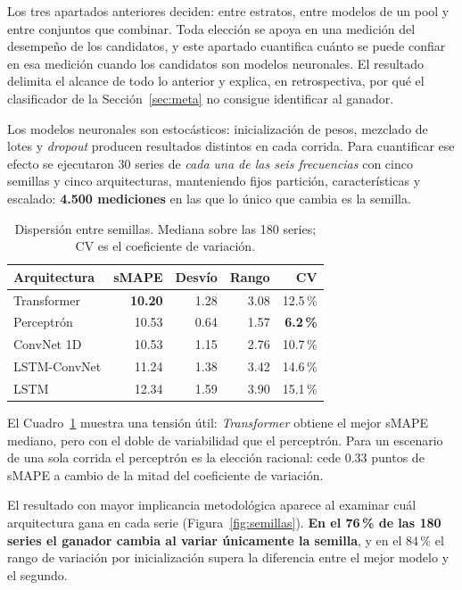 Los tres apartados anteriores deciden: entre estratos, entre modelos de un pool y
entre conjuntos que combinar.
Toda elección se apoya en una medición del desempeño de los candidatos, y este
apartado cuantifica cuánto se puede confiar en esa medición cuando los candidatos son
modelos neuronales. El resultado delimita el alcance de todo lo anterior y explica, en
retrospectiva, por qué el clasificador de la Sección~\ref{sec:meta} no consigue
identificar al ganador.

Los modelos neuronales son estocásticos: inicialización de pesos, mezclado de lotes
y \emph{dropout} producen resultados distintos en cada corrida. Para cuantificar ese
efecto se ejecutaron 30 series de \emph{cada una de las seis frecuencias} con cinco
semillas y cinco arquitecturas, manteniendo fijos partición, características y
escalado: \textbf{4.500 mediciones} en las que lo único que cambia es la semilla.

\begin{table}[htbp]
\centering
\caption{Dispersión entre semillas. Mediana sobre las 180 series; CV es el
coeficiente de variación.}
\label{tab:semillas}
\begin{tabular}{lrrrr}
\toprule
\textbf{Arquitectura} & \textbf{sMAPE} & \textbf{Desvío} & \textbf{Rango} & \textbf{CV} \\
\midrule
Transformer  & \textbf{10.20} & 1.28 & 3.08 & 12.5\,\% \\
Perceptrón   & 10.53 & 0.64 & 1.57 & \textbf{6.2\,\%} \\
ConvNet 1D   & 10.53 & 1.15 & 2.76 & 10.7\,\% \\
LSTM-ConvNet & 11.24 & 1.38 & 3.42 & 14.6\,\% \\
LSTM         & 12.34 & 1.59 & 3.90 & 15.1\,\% \\
\bottomrule
\end{tabular}
\end{table}

El Cuadro~\ref{tab:semillas} muestra una tensión útil: \emph{Transformer} obtiene el
mejor sMAPE mediano, pero con el doble de variabilidad que el perceptrón. Para un
escenario de una sola corrida el perceptrón es la elección racional: cede $0.33$
puntos de sMAPE a cambio de la mitad del coeficiente de variación.

El resultado con mayor implicancia metodológica aparece al examinar cuál
arquitectura gana en cada serie (Figura~\ref{fig:semillas}). \textbf{En el
76\,\% de las 180 series el ganador cambia al variar únicamente la semilla}, y en el
84\,\% el rango de variación por inicialización supera la diferencia entre el mejor
modelo y el segundo.

